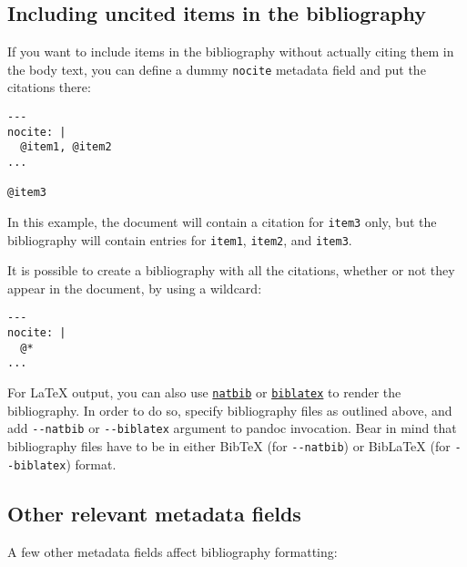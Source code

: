\documentclass[
]{article}
\begin{document}
\hypertarget{including-uncited-items-in-the-bibliography}{%
\subsection{Including uncited items in the
bibliography}\label{including-uncited-items-in-the-bibliography}}

If you want to include items in the bibliography without actually citing
them in the body text, you can define a dummy \texttt{nocite} metadata
field and put the citations there:

\begin{verbatim}
---
nocite: |
  @item1, @item2
...

@item3
\end{verbatim}

In this example, the document will contain a citation for \texttt{item3}
only, but the bibliography will contain entries for \texttt{item1},
\texttt{item2}, and \texttt{item3}.

It is possible to create a bibliography with all the citations, whether
or not they appear in the document, by using a wildcard:

\begin{verbatim}
---
nocite: |
  @*
...
\end{verbatim}

For LaTeX output, you can also use
\href{https://ctan.org/pkg/natbib}{\texttt{natbib}} or
\href{https://ctan.org/pkg/biblatex}{\texttt{biblatex}} to render the
bibliography. In order to do so, specify bibliography files as outlined
above, and add \texttt{-\/-natbib} or \texttt{-\/-biblatex} argument to
pandoc invocation. Bear in mind that bibliography files have to be in
either BibTeX (for \texttt{-\/-natbib}) or BibLaTeX (for
\texttt{-\/-biblatex}) format.

\hypertarget{other-relevant-metadata-fields}{%
\subsection{Other relevant metadata
fields}\label{other-relevant-metadata-fields}}

A few other metadata fields affect bibliography formatting:
\end{document}
